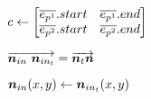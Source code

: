 \begin{algorithm}[H]
\begin{algorithmic}[1]
                \State $ \Corridor \gets
                    \begin{bmatrix}
                        \EdgeParallelA.start &
                        \EdgeParallelA.end \\
    
                        \EdgeParallelB.start &
                        \EdgeParallelB.end \\
                    \end{bmatrix} $
    
    
                    \State $ \protect\overrightarrow{\bm{n}_{in} ~\bm{n}_{in_t}} = \protect\overrightarrow{\bm{n}_t\bm{n}} $
    
                    \State $ \bm{n}_{in}(x,y) \gets \bm{n}_{in_t}(x,y) $
    
                \EndFor
            \EndProcedure
        \end{algorithmic}
    \end{algorithm}
    
